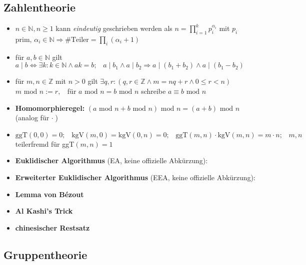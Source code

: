 \documentclass[10pt,a4paper]{article}
\begin{document}
\subsection{Zahlentheorie}
\begin{itemize}
\item $n\in \mathbb{N}, n\geq 1$ kann \textit{eindeutig} geschrieben werden als $n=\prod_{i=1}^{k} p_{i}^{\alpha_{i}}$ mit $p_{i}$ prim, $\alpha_{i} \in \mathbb{N}\Rightarrow\#\text{Teiler}=\prod_{i} (\alpha_{i}+1)$
\item für $a,b \in \mathbb{N}$ gilt $a\mid b \Leftrightarrow \exists k :k\in\mathbb{N}\land  ak=b;\;\;\; a\mid b_{1}\land a\mid b_{2} \Rightarrow a\mid (b_{1}+b_{2}) \land a\mid (b_{1}-b_{2})$
\item für $m,n \in \mathbb{Z}$ mit $n>0$ gilt $\exists q,r:( q,r \in \mathbb{Z}\land m=nq+r\land 0\leq r<n)$\\ $m \text{ mod } n:=r,\;\;$
für $a \text{ mod } n =b \text{ mod } n$ schreibe $a \equiv b \text{ mod } n$
\item \textbf{Homomorphieregel:} $(a \text{ mod } n+b \text{ mod } n) \text{ mod } n=(a+b) \text{ mod } n\;\;\;\;\;$ (analog für $\cdot\;$)
\item $\text{ggT}(0,0)=0;\;\;\;\text{kgV}(m,0)=\text{kgV}(0,n)=0;\;\;\;\text{ggT}(m,n)\cdot \text{kgV}(m,n)=m\cdot n;\;\;\; m,n$ teilerfremd für ggT$(m,n)=1$
\item \textbf{Euklidischer Algorithmus} (EA, keine offizielle Abkürzung):
\item \textbf{Erweiterter Euklidischer Algorithmus} (EEA, keine offizielle Abkürzung): 
\item \textbf{Lemma von Bézout}
\item \textbf{Al Kashi's Trick}
\item \textbf{chinesischer Restsatz}

\end{itemize}



\subsection{Gruppentheorie}
\end{document}
